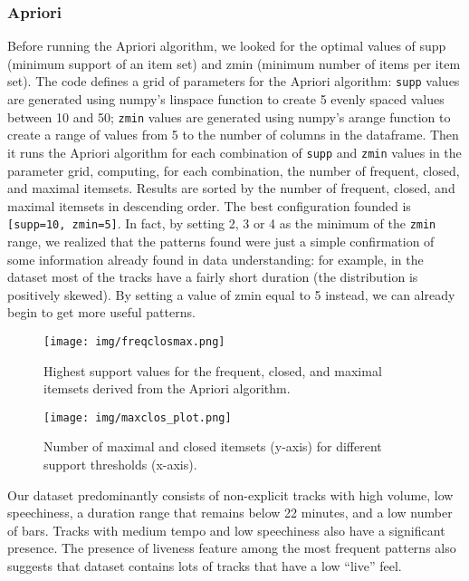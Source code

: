 \subsubsection*{Apriori}
Before running the Apriori algorithm, we looked for the optimal values of supp (minimum support of an item set) and zmin (minimum number of items per item set). The code defines a grid of parameters for the Apriori algorithm: \texttt{supp} values are generated using numpy’s linspace function to create 5 evenly spaced values between 10 and 50; \texttt{zmin} values are generated using numpy’s arange function to create a range of values from 5 to the number of columns in the dataframe. Then it runs the Apriori algorithm for each combination of \texttt{supp} and \texttt{zmin} values in the parameter grid, computing, for each combination, the number of frequent, closed, and maximal itemsets. Results are sorted by the number of frequent, closed, and maximal itemsets in descending order. The best configuration founded is \texttt{[supp=10, zmin=5]}. In fact, by setting 2, 3 or 4 as the minimum of the \texttt{zmin} range, we realized that the patterns found were just a simple confirmation of some information already found in data understanding: for example, in the dataset most of the tracks have a fairly short duration (the distribution is positively skewed). By setting a value of zmin equal to 5 instead, we can already begin to get more useful patterns.
\begin{figure}[H]
\centering
\begin{minipage}{.5\textwidth}
\centering
    \texttt{[image: img/freqclosmax.png]}
    \caption{Highest support values for the frequent, closed, and maximal itemsets derived from the Apriori algorithm.}
    \label{fig:enter-label}
\end{minipage}%
\hspace{0.5cm}
\begin{minipage}{.4\textwidth}
  \centering
  \texttt{[image: img/maxclos\_plot.png]}
  \caption{Number of maximal and closed itemsets (y-axis) for different support thresholds (x-axis).}
  \label{fig:test2}
\end{minipage}
\end{figure}
\noindent Our dataset predominantly consists of non-explicit tracks with high volume, low speechiness, a duration range that remains below 22 minutes, and a low number of bars. Tracks with medium tempo and low speechiness also have a significant presence. The presence of liveness feature among the most frequent patterns also suggests that dataset contains lots of tracks that have a low “live” feel.
